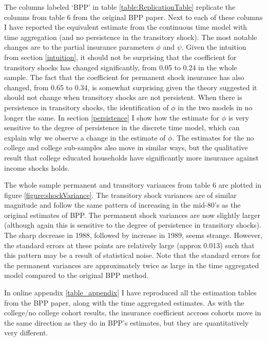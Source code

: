 \documentclass[AER]{AEA}
\begin{document}
The columns labeled `BPP' in table \ref{table:ReplicationTable} replicate the columns from table 6 from the original BPP paper. Next to each of these columns I have reported the equivalent estimate from the continuous time model with time aggregation (and no persistence in the transitory shock). The most notable changes are to the partial insurance parameters $\phi$ and $\psi$. Given the intuition from section \ref{intuition}, it should not be surprising that the coefficient for transitory shocks has changed significantly, from 0.05 to 0.24 in the whole sample. The fact that the coefficient for permanent shock insurance has also changed, from 0.65 to 0.34, is somewhat surprising given the theory suggested it should not change when transitory shocks are not persistent. When there is persistence in transitory shocks, the identification of $\phi$ in the two models in no longer the same. In section \ref{persistence} I show how the estimate for $\phi$ is very sensitive to the degree of persistence in the discrete time model, which can explain why we observe a change in the estimate of $\phi$. The estimates for the no college and college sub-samples also move in similar ways, but the qualitative result that college educated households have significantly more insurance against income shocks holds.

The whole sample permanent and transitory variances from table 6 are plotted in figure \ref{figure:shockVariance}. The transitory shock variances are of similar magnitude and follow the same pattern of increasing in the mid-80's as the original estimates of BPP. The permanent shock variances are now slightly larger (although again this is sensitive to the degree of persistence in transitory shocks). The sharp decrease in 1988, followed by increase in 1989, seems strange. However, the standard errors at these points are relatively large (approx 0.013) such that this pattern may be a result of statistical noise. Note that the standard errors for the permanent variances are approximately twice as large in the time aggregated model compared to the original BPP method.

In online appendix \ref{table_appendix} I have reproduced all the estimation tables from the BPP paper, along with the time aggregated estimates. As with the college/no college cohort results, the insurance coefficient accross cohorts move in the same direction as they do in BPP's estimates, but they are quantitatively very different.


\end{document}
